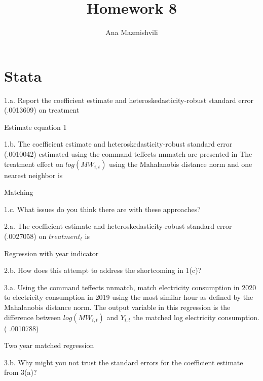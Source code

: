 \documentclass{article}
\title{Homework 8}
\author{Ana Mazmishvili}
\begin{document}
  
\maketitle

\section{Stata}
\noindent 1.a.  Report the coefficient estimate and heteroskedasticity-robust standard error (.0013609) on treatment

\begin{table}[h]
    \centering
    
    \caption{Estimate equation 1}
    \label{tab:reg1}
\end{table}

\noindent 1.b. The coefficient estimate and heteroskedasticity-robust standard error  (.0010042) estimated using the command teffects nnmatch are presented in   
The treatment effect on $ log(MW_{i,t})$ using the Mahalanobis distance norm and one nearest neighbor is 

\begin{table}[h]
    \centering
    
    \caption{Matching}
    \label{tab:match}
\end{table}
\clearpage

\noindent 1.c. What issues do you think there are with these approaches?

\noindent 2.a.  The coefficient estimate and heteroskedasticity-robust standard error (.0027058) on $treatment_t$ is 

\begin{table}[h]
    \centering
    
    \caption{Regression with year indicator}
    \label{tab:reg2}
\end{table}

\noindent 2.b. How does this attempt to address the shortcoming in 1(c)?

\noindent 3.a. Using the command teffects nnmatch, match electricity consumption in 2020 to electricity consumption in 2019 using the most similar hour as defined by the Mahalanobis distance norm. The output variable in this regression is the difference between  $log(MW_{i,t})$ and $Y_{i,t}$ the matched log electricity consumption.  ( .0010788)

\begin{table}[h]
    \centering
    
    \caption{Two year matched regression}
    \label{tab:reg3}
\end{table}

\noindent 3.b. Why might you not trust the standard errors for the coefficient estimate from 3(a)?
\end{document}
